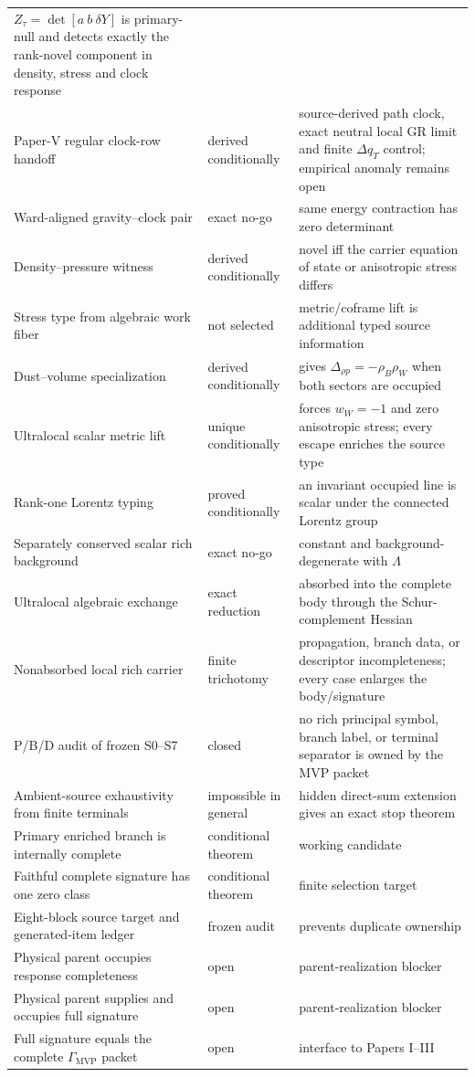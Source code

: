\documentclass[11pt]{article}
\newcommand{\GMVP}{\Gamma_{\mathrm{MVP}}}
\begin{document}
{\begin{longtable}{p{.46\linewidth}p{.17\linewidth}p{.25\linewidth}}
\(Z_\tau=\det[a\ b\ \delta Y]\) is primary-null and detects exactly the
rank-novel component in density, stress and clock response\\
Paper-V regular clock-row handoff & derived conditionally & source-derived
path clock, exact neutral local GR limit and finite \(\Delta q_T\) control;
empirical anomaly remains open\\
Ward-aligned gravity--clock pair & exact no-go & same energy contraction has
zero determinant\\
Density--pressure witness & derived conditionally & novel iff the carrier
equation of state or anisotropic stress differs\\
Stress type from algebraic work fiber & not selected & metric/coframe lift is
additional typed source information\\
Dust--volume specialization & derived conditionally & gives
\(\Delta_{\rho p}=-\rho_B\rho_W\) when both sectors are occupied\\
Ultralocal scalar metric lift & unique conditionally & forces \(w_W=-1\) and
zero anisotropic stress; every escape enriches the source type\\
Rank-one Lorentz typing & proved conditionally & an invariant occupied line is
scalar under the connected Lorentz group\\
Separately conserved scalar rich background & exact no-go & constant and
background-degenerate with \(\Lambda\)\\
Ultralocal algebraic exchange & exact reduction & absorbed into the complete
body through the Schur-complement Hessian\\
Nonabsorbed local rich carrier & finite trichotomy & propagation, branch data,
or descriptor incompleteness; every case enlarges the body/signature\\
P/B/D audit of frozen S0--S7 & closed & no rich principal symbol, branch label,
or terminal separator is owned by the MVP packet\\
Ambient-source exhaustivity from finite terminals & impossible in general
& hidden direct-sum extension gives an exact stop theorem\\
Primary enriched branch is internally complete & conditional theorem & working candidate\\
Faithful complete signature has one zero class & conditional theorem & finite selection target\\
Eight-block source target and generated-item ledger & frozen audit & prevents duplicate ownership\\
Physical parent occupies response completeness & open & parent-realization blocker\\
Physical parent supplies and occupies full signature & open & parent-realization blocker\\
Full signature equals the complete \(\GMVP\) packet & open & interface to Papers I--III\\
\bottomrule
\end{longtable}
}
\end{document}
